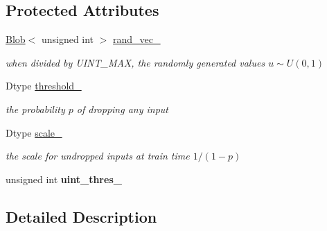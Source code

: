 \subsection*{Protected Attributes}
\begin{DoxyCompactItemize}
\item 
\hyperlink{classcaffe_1_1Blob}{Blob}$<$ unsigned int $>$ \hyperlink{classcaffe_1_1DropoutLayer_a7a2c28420611a960a964e56acdbe2b47}{rand\+\_\+vec\+\_\+}\hypertarget{classcaffe_1_1DropoutLayer_a7a2c28420611a960a964e56acdbe2b47}{}\label{classcaffe_1_1DropoutLayer_a7a2c28420611a960a964e56acdbe2b47}

\begin{DoxyCompactList}\small\item\em when divided by U\+I\+N\+T\+\_\+\+M\+AX, the randomly generated values $u\sim U(0,1)$ \end{DoxyCompactList}\item 
Dtype \hyperlink{classcaffe_1_1DropoutLayer_a8e9d88e6128a97101c27ce8a11158ca6}{threshold\+\_\+}\hypertarget{classcaffe_1_1DropoutLayer_a8e9d88e6128a97101c27ce8a11158ca6}{}\label{classcaffe_1_1DropoutLayer_a8e9d88e6128a97101c27ce8a11158ca6}

\begin{DoxyCompactList}\small\item\em the probability $ p $ of dropping any input \end{DoxyCompactList}\item 
Dtype \hyperlink{classcaffe_1_1DropoutLayer_ac8702c053de0fea389f5a0ded8cdc544}{scale\+\_\+}\hypertarget{classcaffe_1_1DropoutLayer_ac8702c053de0fea389f5a0ded8cdc544}{}\label{classcaffe_1_1DropoutLayer_ac8702c053de0fea389f5a0ded8cdc544}

\begin{DoxyCompactList}\small\item\em the scale for undropped inputs at train time $ 1 / (1 - p) $ \end{DoxyCompactList}\item 
unsigned int {\bfseries uint\+\_\+thres\+\_\+}\hypertarget{classcaffe_1_1DropoutLayer_ae8ba2b98a7bc12643eec8ad72a66be21}{}\label{classcaffe_1_1DropoutLayer_ae8ba2b98a7bc12643eec8ad72a66be21}

\end{DoxyCompactItemize}


\subsection{Detailed Description}
